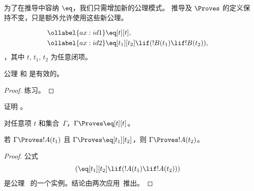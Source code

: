 \documentclass[../../../include/open-logic-section]{subfiles}
\begin{document}


为了在推导中容纳 $\eq$，我们只需增加新的公理模式。
推导及 $\Proves$ 的定义保持不变，只是额外允许使用这些新公理。

\begin{defn}[等词公理]
\begin{align}
\ollabel{ax:id1} & \eq[t][t], \\
\ollabel{ax:id2} & \eq[t_1][t_2] \lif (!B(t_1) \lif
  !B(t_2)),
\end{align}，其中 $t$, $t_1$, $t_2$ 为任意闭项。
\end{defn}

\begin{prop}
  公理  和  是有效的。
\end{prop}

\begin{proof}
练习。
\end{proof}

\begin{prob}
证明 。
\end{prob}

\begin{prop}
 对任意项 $t$ 和集合~$\Gamma$，$\Gamma \Proves \eq[t][t]$。
\end{prop}

\begin{prop}
  若 $\Gamma \Proves !A(t_1)$ 且 $\Gamma \Proves
  \eq[t_1][t_2]$，则 $\Gamma \Proves !A(t_2)$。
\end{prop}

\begin{proof}
公式
\[
(\eq[t_1][t_2] \lif (!A(t_1) \lif !A(t_2)))
\]
是公理~ 的一个实例。结论由两次应用~\MP 推出。
\end{proof}
\end{document}

